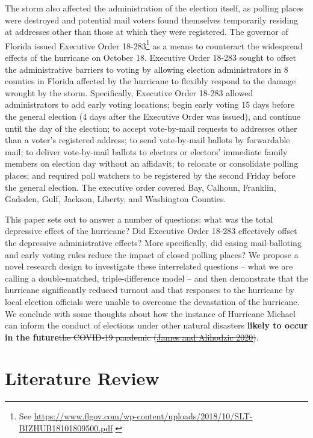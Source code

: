 \documentclass[
  12pt,
]{article}
\begin{document}
The storm also affected the administration of the election itself, as polling places were destroyed and potential mail voters found themselves temporarily residing at addresses other than those at which they were registered. The governor of Florida issued Executive Order 18-283\footnote{See \url{https://www.flgov.com/wp-content/uploads/2018/10/SLT-BIZHUB18101809500.pdf}.} as a means to counteract the widespread effects of the hurricane on October 18. Executive Order 18-283 sought to offset the administrative barriers to voting by allowing election administrators in 8 counties in Florida affected by the hurricane to flexibly respond to the damage wrought by the storm. Specifically, Executive Order 18-283 allowed administrators to add early voting locations; begin early voting 15 days before the general election (4 days after the Executive Order was issued), and continue until the day of the election; to accept vote-by-mail requests to addresses other than a voter's registered address; to send vote-by-mail ballots by forwardable mail; to deliver vote-by-mail ballots to electors or electors' immediate family members on election day without an affidavit; to relocate or consolidate polling places; and required poll watchers to be registered by the second Friday before the general election. The executive order covered Bay, Calhoun, Franklin, Gadsden, Gulf, Jackson, Liberty, and Washington Counties.

This paper sets out to answer a number of questions: what was the total depressive effect of the hurricane? Did Executive Order 18-283 effectively offset the depressive administrative effects? More specifically, did easing mail-balloting and early voting rules reduce the impact of closed polling places? We propose a novel research design to investigate these interrelated questions -- what we are calling a double-matched, triple-difference model -- and then demonstrate that the hurricane significantly reduced turnout and that responses to the hurricane by local election officials were unable to overcome the devastation of the hurricane. We conclude with some thoughts about how the instance of Hurricane Michael can inform the conduct of elections under other natural disasters \textbf{likely to occur in the future}\sout{the COVID-19 pandemic (\protect\hyperlink{ref-James2020}{James and Alihodzic 2020})}.

\hypertarget{literature-review}{%
\section*{Literature Review}\label{literature-review}}
\end{document}
